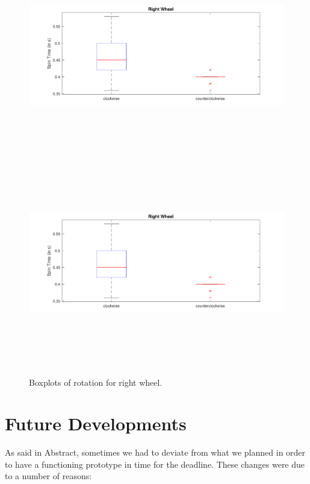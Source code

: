 \documentclass[a4paper,twoside]{book}
\begin{document}
\begin{figure}[h]
 
\includegraphics[width=\paperwidth, height=9cm, center]{img/right} 
\includegraphics[width=\paperwidth, height=9cm, center]{img/right2}
\caption{Boxplots of rotation for right wheel.}

\end{figure}


\chapter{Future Developments}

As said in Abstract, sometimes we had to deviate from what we planned in order to have a functioning prototype in time for the deadline. These changes were due to a number of reasons:
\end{document}
